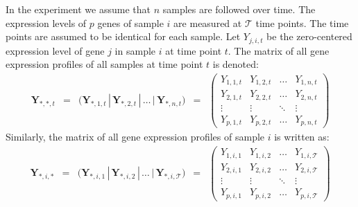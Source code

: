 \documentclass[a4paper]{article}
\theoremstyle{myexamplestyle}
\begin{document}

In the experiment we assume that $n$ samples are followed over time. The expression levels of $p$ genes of sample $i$ are measured at $\mathcal{T}$ time points. The time points are assumed to be identical for each sample. Let $Y_{j,i,t}$ be the zero-centered expression level of gene $j$ in sample $i$ at time point $t$. The matrix of all gene expression profiles of all samples at time point $t$ is denoted:
\begin{eqnarray*}
\mathbf{Y}_{\ast, \ast, t} & = & \big(\mathbf{Y}_{\ast, 1, t} \, | \,  \mathbf{Y}_{\ast,2,t} \, | \,  \ldots \, | \,  \mathbf{Y}_{\ast, n, t} \big) \, \, \, = \, \, \,
\left(
\begin{array}{cccc}
Y_{1,1,t} & Y_{1,2,t} & \ldots & Y_{1,n,t}
\\
Y_{2,1,t} & Y_{2,2,t} & \ldots & Y_{2,n,t}
\\
\vdots & \vdots & \ddots & \vdots
\\
Y_{p,1,t} & Y_{p,2,t} & \ldots & Y_{p,n,t}
\end{array}\right)
\end{eqnarray*}
Similarly, the matrix of all gene expression profiles of sample $i$ is written as:
\begin{eqnarray*}
\mathbf{Y}_{\ast, i, \ast} & = &
\big(\mathbf{Y}_{\ast, i, 1} \, | \,  \mathbf{Y}_{\ast, i, 2} \, | \,  \ldots \, | \, \mathbf{Y}_{\ast, i, \mathcal{T}} \big) \, \, \, = \, \, \,
\left(
\begin{array}{cccc}
Y_{1,i,1} & Y_{1,i,2} & \ldots & Y_{1,i,\mathcal{T}}
\\
Y_{2,i,1} & Y_{2,i,2} & \ldots & Y_{2,i,\mathcal{T}}
\\
\vdots & \vdots & \ddots & \vdots
\\
Y_{p,i,1} & Y_{p,i,2} & \ldots & Y_{p,i,\mathcal{T}}
\end{array}\right)
\end{eqnarray*}
\end{document}
